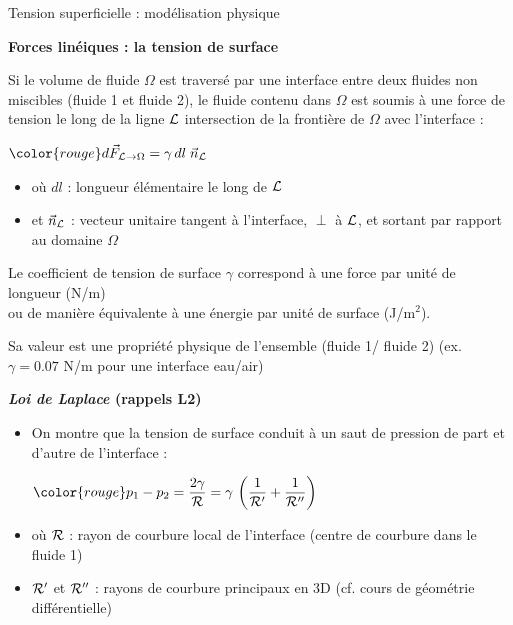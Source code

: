 \begin{frame}{Tension superficielle : modélisation physique}

\small

\textbf{Forces linéiques : la tension de surface} \medskip

Si le volume de fluide $\Omega$ est traversé par une interface entre deux fluides non miscibles (fluide 1 et fluide 2),
le fluide contenu dans $\Omega$ est soumis à une force de tension le long de la ligne $\cal L$
intersection de la frontière de $\Omega$ avec l'interface :

\medskip

\centerline{$ \color{rouge} \displaystyle d\myvec{F}_{{\cal L} \rightarrow \Omega}  = \gamma \, dl \; \myvec{n}_{\cal L} $}
\begin{itemize}
\item[]
	o{\`u} $dl$ : longueur élémentaire le long de $\cal L$
\item[]
	et $\vec{n}_{\cal L}$ : vecteur unitaire tangent à l'interface, $\perp$ à $\cal L$, et sortant par rapport au domaine $\Omega$
\end{itemize}

\smallskip

\pause

Le coefficient de \textcolor{rouge}{tension de surface} $\gamma$ 
correspond à une force par unité de longueur (N/m) 
\\
ou de manière équivalente à une énergie par unité de surface (J/m$^2$).



\medskip

Sa valeur est une propriété physique de l'ensemble (fluide 1/ fluide 2)
(ex. $\gamma = 0.07$ N/m pour une interface eau/air)

\pause

\medskip

{\bf  \textsl{Loi de Laplace} (rappels L2)}


\begin{itemize}
\item[]
On montre que la tension de surface conduit à un saut de pression 
de part et d'autre de l'interface :

\centerline{$ \displaystyle \color{rouge} p_1 - p_2 = \frac{2 \gamma}{\cal R} 
                                      = \gamma \, \left (\frac{1}{\cal R'}+\frac{1}{\cal R''}\right)$}
\item[]
o{\`u} $\cal R$ : rayon de courbure local de l'interface (centre de courbure dans le fluide 1)
\item[]
 $\cal R'$ et $\cal R''$ : rayons de courbure principaux en 3D (cf. cours de géométrie différentielle)
\end{itemize}



\end{frame}
